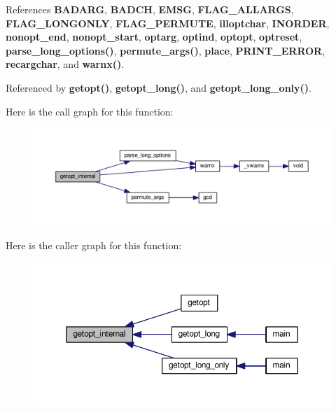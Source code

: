 References {\bf B\+A\+D\+A\+RG}, {\bf B\+A\+D\+CH}, {\bf E\+M\+SG}, {\bf F\+L\+A\+G\+\_\+\+A\+L\+L\+A\+R\+GS}, {\bf F\+L\+A\+G\+\_\+\+L\+O\+N\+G\+O\+N\+LY}, {\bf F\+L\+A\+G\+\_\+\+P\+E\+R\+M\+U\+TE}, {\bf illoptchar}, {\bf I\+N\+O\+R\+D\+ER}, {\bf nonopt\+\_\+end}, {\bf nonopt\+\_\+start}, {\bf optarg}, {\bf optind}, {\bf optopt}, {\bf optreset}, {\bf parse\+\_\+long\+\_\+options()}, {\bf permute\+\_\+args()}, {\bf place}, {\bf P\+R\+I\+N\+T\+\_\+\+E\+R\+R\+OR}, {\bf recargchar}, and {\bf warnx()}.



Referenced by {\bf getopt()}, {\bf getopt\+\_\+long()}, and {\bf getopt\+\_\+long\+\_\+only()}.



Here is the call graph for this function\+:
\nopagebreak
\begin{figure}[H]
\begin{center}
\leavevmode
\includegraphics[width=350pt]{d5/ded/limesuite-dev_2external_2msvc_2getopt_8h_a8bcfc41ffd83b00297822b5644eb895d_cgraph}
\end{center}
\end{figure}




Here is the caller graph for this function\+:
\nopagebreak
\begin{figure}[H]
\begin{center}
\leavevmode
\includegraphics[width=350pt]{d5/ded/limesuite-dev_2external_2msvc_2getopt_8h_a8bcfc41ffd83b00297822b5644eb895d_icgraph}
\end{center}
\end{figure}


